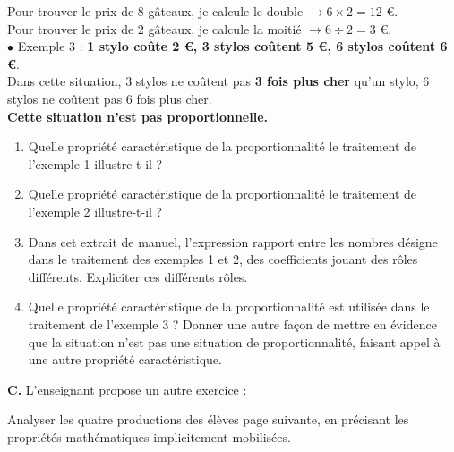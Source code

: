 \begin{exercice}[CRPE 2014 G2]
\begin{center}
{\begin{minipage}{12cm}
{   Pour trouver le prix de 8 gâteaux, je calcule le double $\rightarrow 6\times2 =12$ \euro. \\
   Pour trouver le prix de 2 gâteaux, je calcule la moitié $\rightarrow 6\div2 =3$ \euro. \\
    $\bullet$ Exemple 3 : {\bf 1 stylo coûte 2 \euro, 3 stylos coûtent 5 \euro, 6 stylos coûtent 6 \euro}. \\
    Dans cette situation, 3 stylos ne coûtent pas {\bf 3 fois plus cher} qu'un stylo, 6 stylos ne coûtent pas 6 fois plus cher. \\
    {\bf Cette situation n'est pas proportionnelle.}}
\end{minipage}}
\end{center}
\begin{enumerate}
   \item Quelle propriété caractéristique de la proportionnalité le traitement de l'exemple 1 illustre-t-il ?
   \item Quelle propriété caractéristique de la proportionnalité le traitement de l'exemple 2 illustre-t-il ?
   \item Dans cet extrait de manuel, l'expression \og rapport entre les nombres \fg{} désigne dans le traitement des exemples 1 et 2, des coefficients jouant des rôles différents.
Expliciter ces différents rôles.
   \item Quelle propriété caractéristique de la proportionnalité est utilisée dans le traitement de l'exemple 3 ? Donner une autre façon de mettre en évidence que la situation n'est pas une situation de proportionnalité, faisant appel à une autre propriété caractéristique.
\end{enumerate}
{\bf C.} L'enseignant propose un autre exercice :
\begin{center}
\end{center}
Analyser les quatre productions des élèves page suivante, en précisant les propriétés mathématiques implicitement mobilisées.
\begin{center}

\end{center}
\end{exercice}
